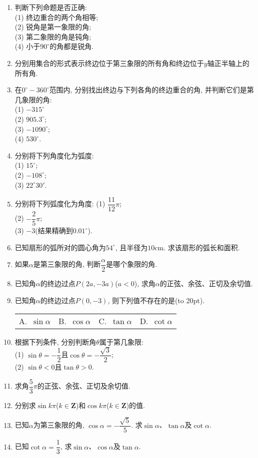 \documentclass[10pt,a4paper]{article}
\newcommand{\bracket}[1]{(\hbox to #1pt{})}
\newcommand{\fourch}[4]{\par\begin{tabular}{p{.23\textwidth}p{.23\textwidth}p{.23\textwidth}p{.23\textwidth}}
A.~#1 &B.~#2& C.~#3& D.~#4
\end{tabular}}
\begin{document}
\begin{enumerate}[1.]
\item 判断下列命题是否正确:\\
(1) 终边重合的两个角相等;\\
(2) 锐角是第一象限的角;\\
(3) 第二象限的角是钝角;\\
(4) 小于$90^\circ$的角都是锐角.
\item 分别用集合的形式表示终边位于第三象限的所有角和终边位于$y$轴正半轴上的所有角.
\item 在$0^\circ-360^\circ$范围内, 分别找出终边与下列各角的终边重合的角, 并判断它们是第几象限的角:\\
(1) $-315^\circ$\\
(2) $905.3^\circ$;\\
(3) $-1090^\circ$;\\
(4) $530^\circ$.
\item 分别将下列角度化为弧度:\\
(1) $15^\circ$;\\
(2) $-108^\circ$;\\
(3) $22^\circ 30'$.
\item 分别将下列弧度化为角度:
(1) $\dfrac{11}{12}\pi$;\\
(2) $-\dfrac 25\pi$;\\
(3) $-3$(结果精确到$0.01^\circ$).
\item 已知扇形的弧所对的圆心角为$54^\circ$, 且半径为$10\text{cm}$. 求该扇形的弧长和面积.
\item 如果$\alpha$是第三象限的角, 判断$\dfrac\alpha 2$是哪个象限的角.
\item 已知角$\alpha$的终边过点$P(2a, -3a)$($a<0$), 求角$\alpha$的正弦、余弦、正切及余切值.
\item 已知角$\alpha$的终边过点$P(0, -3)$, 则下列值不存在的是\bracket{20}.
\fourch{$\sin \alpha$}{$\cos \alpha$}{$\tan \alpha$}{$\cot \alpha$}
\item 根据下列条件, 分别判断角$\theta$属于第几象限:\\
(1) $\sin \theta =-\dfrac 12$且$\cos \theta =-\dfrac{\sqrt 3}2$;\\
(2) $\sin \theta <0$且$\tan \theta >0$.
\item 求角$\dfrac 53\pi$的正弦、余弦、正切及余切值.
\item 分别求$\sin k\pi$($k\in \mathbf{Z}$)和$\cos k\pi$($k\in \mathbf{Z}$)的值.
\item 已知$\alpha$为第三象限的角, $\cos \alpha=-\dfrac{\sqrt 5}5$. 求$\sin \alpha$、$\tan \alpha$及$\cot \alpha$.
\item 已知$\cot \alpha=\dfrac 13$, 求$\sin \alpha$、$\cos \alpha$及$\tan \alpha$.

\end{enumerate}
\end{document}
